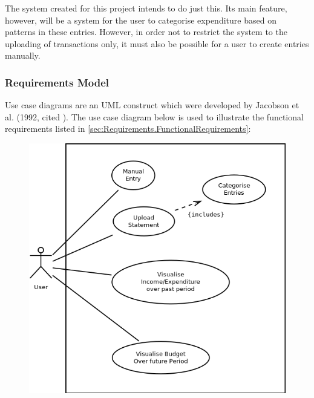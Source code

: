 The system created for this project intends to do just this. Its main feature,
however, will be a system for the user to categorise expenditure based on
patterns in these entries. However, in order not to restrict the system to the
uploading of transactions only, it must also be possible for a user to create
entries manually.


\subsubsection{Requirements Model} \label{sec:Requirements.RequirementsModel}

Use case diagrams are an UML construct which were developed by Jacobson et al.
(1992, cited \cite[][p.~154]{bennett2010object}). The use case diagram below is
used to illustrate the functional requirements listed in
\ref{sec:Requirements.FunctionalRequirements}:

\begin{figure}[ht!]
  \begin{center}
    \includegraphics[width=14cm]{./contents/img/Use_Case_Diagram.png}
  \end{center}
\end{figure}
\FloatBarrier


